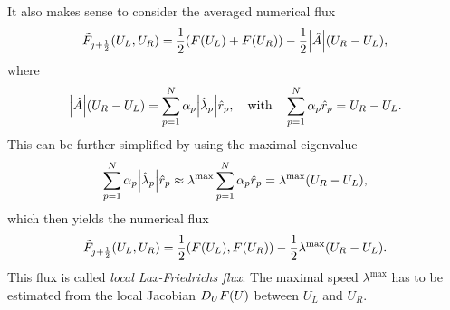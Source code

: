 \begin{example}
	It also makes sense to consider the averaged numerical flux
	\[
		\tilde{F}_{j + \frac{1}{2}}\parentheses*{U_L, U_R} = \frac{1}{2}\parentheses*{F\parentheses*{U_L} + F\parentheses*{U_R}} - \frac{1}{2}\absolute*{\hat{A}}\parentheses*{U_R - U_L},
	\]
	where
	\[
		\absolute*{\hat{A}}\parentheses*{U_R - U_L} = \sum_{p = 1}^N \alpha_p \absolute*{\hat{\lambda}_p}\hat{r}_p, \quad \text{with} \quad \sum_{p = 1}^N \alpha_p \hat{r}_p = U_R - U_L.
	\]
	This can be further simplified by using the maximal eigenvalue
	\[
		\sum_{p = 1}^N \alpha_p \absolute*{\hat{\lambda}_p}\hat{r}_p \approx \lambda^\text{max} \sum_{p = 1}^N \alpha_p \hat{r}_p = \lambda^\text{max} \parentheses*{U_R - U_L},
	\]
	which then yields the numerical flux
	\[
		\tilde{F}_{j + \frac{1}{2}}\parentheses*{U_L, U_R} = \frac{1}{2}\parentheses*{F\parentheses*{U_L}, F\parentheses*{U_R}} - \frac{1}{2}\lambda^\text{max} \parentheses*{U_R - U_L}.
	\]
	This flux is called \emph{local Lax-Friedrichs flux}.
	The maximal speed \(\lambda^\text{max}\) has to be estimated from the local Jacobian \(D_U F\parentheses*{U}\) between \(U_L\) and \(U_R\).
\end{example}
